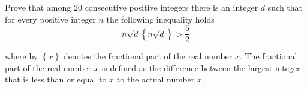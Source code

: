 Prove that among $20$ consecutive positive integers there is an integer $d$ such that for every positive integer $n$ the following inequality holds$$n \sqrt{d} \left\{n \sqrt {d} \right \} > \dfrac{5}{2}$$

where by $\left \{x \right \}$ denotes the fractional part of the real number $x$. The fractional part of the real number $x$ is defined as the difference between the largest integer that is less than or equal to $x$ to the actual number $x$.
